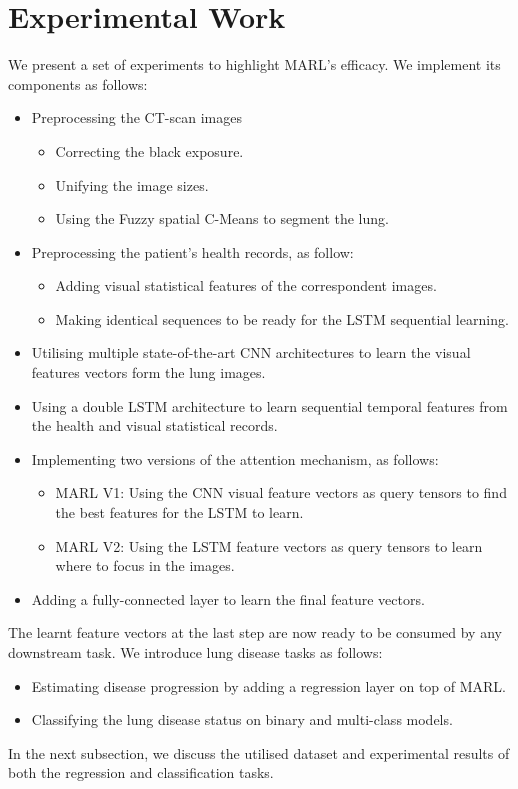 \documentclass[conference]{IEEEtran}
\begin{document}
\section{Experimental Work}\label{exp}
We present a set of experiments to highlight MARL's efficacy. We implement its components as follows:
\begin{itemize}
    \item Preprocessing the CT-scan images 
    \begin{itemize}
        \item Correcting the black exposure. 
        \item Unifying the image sizes. 
        \item Using the Fuzzy spatial C-Means to segment the lung.
    \end{itemize}
    \item Preprocessing the patient's health records, as follow:
    \begin{itemize}
        \item Adding visual statistical features of the correspondent images.
        \item Making identical sequences to be ready for the LSTM sequential learning.
    \end{itemize}
    \item Utilising multiple state-of-the-art CNN architectures to learn the visual features vectors form the lung images.
    \item Using a double LSTM architecture to learn sequential temporal features from the health and visual statistical records. 
    \item Implementing two versions of the attention mechanism, as follows:
    \begin{itemize}
        \item MARL V1: Using the CNN visual feature vectors as query tensors to find the best features for the LSTM to learn. 
        \item MARL V2: Using the LSTM feature vectors as query tensors to learn where to focus in the images.
    \end{itemize} 
    \item Adding a fully-connected layer to learn the final feature vectors.
\end{itemize}
The learnt feature vectors at the last step are now ready to be consumed by any downstream task. We introduce lung disease tasks as follows:
\begin{itemize}
    \item Estimating disease progression by adding a regression layer on top of MARL.
    \item Classifying the lung disease status on binary and multi-class models.
\end{itemize}
In the next subsection, we discuss the utilised dataset and experimental results of both the regression and classification tasks.
\end{document}
